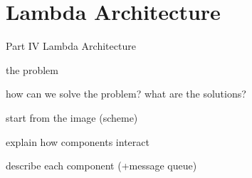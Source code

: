\chapter{Lambda Architecture}
\label{chap:lambda_architecture}

Part IV Lambda Architecture

the problem

how can we solve the problem? what are the solutions?

start from the image (scheme)

explain how components interact

describe each component (+message queue)

